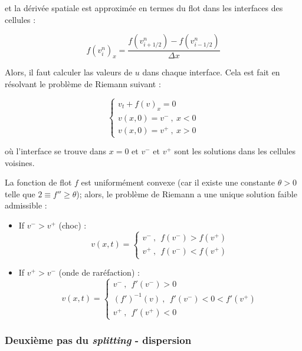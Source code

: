 \noindent et la dérivée spatiale est approximée en termes du flot dans les interfaces des cellules :

\begin{equation*}
f(v_i^n)_x = \frac{f\left(v_{i+1/2}^n\right) - f\left(v_{i-1/2}^n\right)}{\Delta x}
\end{equation*}

\indent Alors, il faut calculer las valeurs de $u$ dans chaque interface. Cela est fait en résolvant le problème de Riemann suivant :

\begin{equation*}
\begin{cases}
v_t + f(v)_x = 0 \\
v(x,0) = v^- \ , \ x < 0 \\
v(x,0) = v^+ \ , \ x > 0
\end{cases}
\end{equation*}

\noindent où l'interface se trouve dans $x=0$ et $v^-$ et $v^+$ sont les solutions dans les cellules voisines.

\indent La fonction de flot $f$ est uniformément convexe (car il existe une constante $\theta > 0$ telle que $2 \equiv f'' \geq \theta$); alors, le problème de Riemann a une unique solution faible admissible  \cite{conservationLaws2002} :

\begin{itemize}
\item  If $v^- > v^+$  (choc) : 
\begin{equation*}
v(x,t) = 
\begin{cases}
v^- \ ,\ \   f(v^-) > f(v^+) \\
v^+ \ ,\ \ f(v^-) < f(v^+)
\end{cases}
\end{equation*}

\item If $v^+ > v^-$  (onde de raréfaction) :
\begin{equation*}
v(x,t) = 
\begin{cases}
v^- \ ,\ \ f'(v^-) > 0 \\
\left(f'\right)^{-1}(v) \ ,\ \ f'(v^-) < 0 < f'(v^+) \\
v^+ \ ,\ \ f'(v^+) < 0 
\end{cases}
\end{equation*}
\end{itemize}


\subsubsection{Deuxième pas du \emph{splitting} - dispersion}

